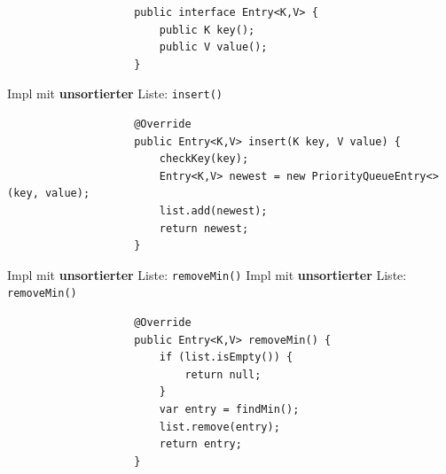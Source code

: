 \documentclass[a4paper, landscape, 8pt]{scrartcl}
\begin{document}
\begin{multicols*}{4}
\begin{lstlisting}
                    public interface Entry<K,V> {
                        public K key();
                        public V value();
                    }
                \end{lstlisting}
                \textcolor{subsectioncolor}{Impl mit {\bfseries unsortierter} Liste: \texttt{insert()}}
                \begin{lstlisting}
                    @Override
                    public Entry<K,V> insert(K key, V value) {
                        checkKey(key);
                        Entry<K,V> newest = new PriorityQueueEntry<>(key, value);
                        list.add(newest);
                        return newest;
                    }
                \end{lstlisting}
                \textcolor{subsectioncolor}{Impl mit {\bfseries unsortierter} Liste: \texttt{removeMin()}}
                \textcolor{subsectioncolor}{Impl mit {\bfseries unsortierter} Liste: \texttt{removeMin()}}
                \begin{lstlisting}
                    @Override
                    public Entry<K,V> removeMin() {
                        if (list.isEmpty()) {
                            return null;
                        }
                        var entry = findMin();
                        list.remove(entry);
                        return entry;
                    }


\end{lstlisting}
\end{multicols*}
\end{document}
